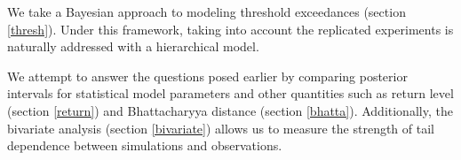 







We take a Bayesian approach to modeling threshold exceedances (section \ref{thresh}). Under this framework, taking into account the replicated experiments is naturally addressed with a hierarchical model.

We attempt to answer the questions posed earlier by comparing posterior intervals for statistical model parameters and other quantities such as return level (section \ref{return}) and Bhattacharyya distance (section \ref{bhatta}). Additionally, the bivariate analysis (section \ref{bivariate}) allows us to measure the strength of tail dependence between simulations and observations.



